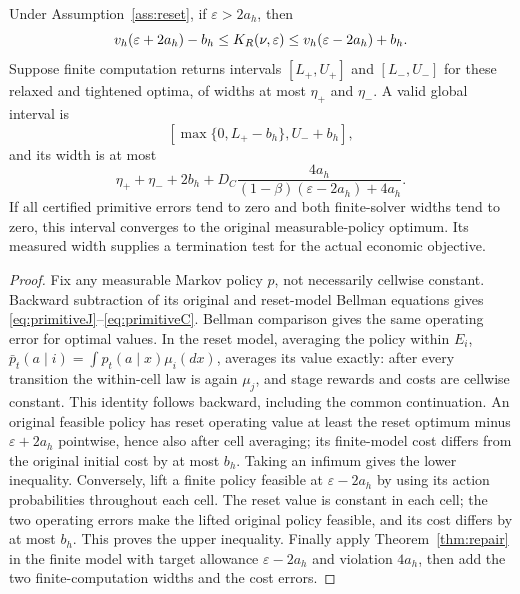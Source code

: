 \begin{theorem}\label{thm:transfer}
Under Assumption~\ref{ass:reset}, if $\varepsilon>2a_h$, then
\begin{equation}\label{eq:transfer}
 v_h(\varepsilon+2a_h)-b_h
 \leq K_R(\nu,\varepsilon)
 \leq v_h(\varepsilon-2a_h)+b_h.
\end{equation}
Suppose finite computation returns intervals $[L_+,U_+]$ and $[L_-,U_-]$ for these relaxed and tightened optima, of widths at most $\eta_+$ and $\eta_-$. A valid global interval is
\begin{equation}\label{eq:total}
 [\max\{0,L_+-b_h\},U_-+b_h],
\end{equation}
and its width is at most
\begin{equation}\label{eq:totalwidth}
 \eta_++\eta_-+2b_h+
 D_C\frac{4a_h}{(1-\beta)(\varepsilon-2a_h)+4a_h}.
\end{equation}
If all certified primitive errors tend to zero and both finite-solver widths tend to zero, this interval converges to the original measurable-policy optimum. Its measured width supplies a termination test for the actual economic objective.
\end{theorem}
\begin{proof}
Fix any measurable Markov policy $p$, not necessarily cellwise constant. Backward subtraction of its original and reset-model Bellman equations gives \eqref{eq:primitiveJ}--\eqref{eq:primitiveC}. Bellman comparison gives the same operating error for optimal values. In the reset model, averaging the policy within $E_i$, $\bar p_t(a\mid i)=\int p_t(a\mid x)\mu_i(dx)$, averages its value exactly: after every transition the within-cell law is again $\mu_j$, and stage rewards and costs are cellwise constant. This identity follows backward, including the common continuation. An original feasible policy has reset operating value at least the reset optimum minus $\varepsilon+2a_h$ pointwise, hence also after cell averaging; its finite-model cost differs from the original initial cost by at most $b_h$. Taking an infimum gives the lower inequality. Conversely, lift a finite policy feasible at $\varepsilon-2a_h$ by using its action probabilities throughout each cell. The reset value is constant in each cell; the two operating errors make the lifted original policy feasible, and its cost differs by at most $b_h$. This proves the upper inequality. Finally apply Theorem~\ref{thm:repair} in the finite model with target allowance $\varepsilon-2a_h$ and violation $4a_h$, then add the two finite-computation widths and the cost errors.
\end{proof}

